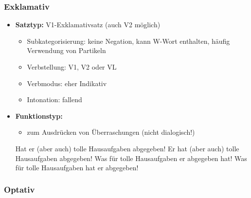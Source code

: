 \begin{frame}
\frametitle{Exklamativ}

\begin{itemize}
	\item \textbf{Satztyp:} V1-Exklamativsatz (auch V2 möglich)
	\begin{itemize}
		\item Subkategorisierung: keine Negation, kann W-Wort enthalten, häufig Verwendung von Partikeln
		\item Verbstellung: V1, V2 oder VL
		\item Verbmodus: eher Indikativ
		\item Intonation: fallend
	\end{itemize}
	\item \textbf{Funktionstyp:}
	\begin{itemize}
		\item zum Ausdrücken von Überraschungen (nicht dialogisch!)
	\end{itemize}
	
	\eal
	\ex Hat er (aber auch) tolle Hausaufgaben abgegeben!
	\ex Er hat (aber auch) tolle Hausaufgaben abgegeben!
	\ex Was für tolle Hausaufgaben er abgegeben hat!
	\ex Was für tolle Hausaufgaben hat er abgegeben!
	\zl
		
\end{itemize}

\end{frame}


\subsubsection{Optativ}



